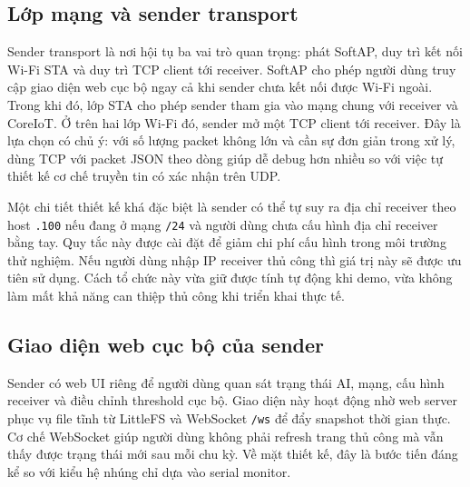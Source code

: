 \documentclass[12pt,a4paper]{report}
\begin{document}
\subsection{Lớp mạng và sender transport}
Sender transport là nơi hội tụ ba vai trò quan trọng: phát SoftAP, duy trì kết nối Wi-Fi STA và duy trì TCP client tới receiver. SoftAP cho phép người dùng truy cập giao diện web cục bộ ngay cả khi sender chưa kết nối được Wi-Fi ngoài. Trong khi đó, lớp STA cho phép sender tham gia vào mạng chung với receiver và CoreIoT. Ở trên hai lớp Wi-Fi đó, sender mở một TCP client tới receiver. Đây là lựa chọn có chủ ý: với số lượng packet không lớn và cần sự đơn giản trong xử lý, dùng TCP với packet JSON theo dòng giúp dễ debug hơn nhiều so với việc tự thiết kế cơ chế truyền tin có xác nhận trên UDP.

Một chi tiết thiết kế khá đặc biệt là sender có thể tự suy ra địa chỉ receiver theo host \texttt{.100} nếu đang ở mạng \texttt{/24} và người dùng chưa cấu hình địa chỉ receiver bằng tay. Quy tắc này được cài đặt để giảm chi phí cấu hình trong môi trường thử nghiệm. Nếu người dùng nhập IP receiver thủ công thì giá trị này sẽ được ưu tiên sử dụng. Cách tổ chức này vừa giữ được tính tự động khi demo, vừa không làm mất khả năng can thiệp thủ công khi triển khai thực tế.

\subsection{Giao diện web cục bộ của sender}
Sender có web UI riêng để người dùng quan sát trạng thái AI, mạng, cấu hình receiver và điều chỉnh threshold cục bộ. Giao diện này hoạt động nhờ web server phục vụ file tĩnh từ LittleFS và WebSocket \texttt{/ws} để đẩy snapshot thời gian thực. Cơ chế WebSocket giúp người dùng không phải refresh trang thủ công mà vẫn thấy được trạng thái mới sau mỗi chu kỳ. Về mặt thiết kế, đây là bước tiến đáng kể so với kiểu hệ nhúng chỉ dựa vào serial monitor.
\end{document}
